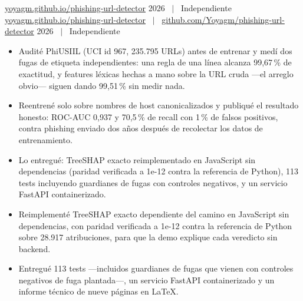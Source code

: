 \ifonepage
{}%
  {\href{https://yoyagm.github.io/phishing-url-detector/}{yoyagm.github.io/phishing-url-detector}}%
  {2026 \ $\vert$ \ Independiente}
\else
{}%
  {\href{https://yoyagm.github.io/phishing-url-detector/}{yoyagm.github.io/phishing-url-detector}
   \ $\vert$ \ \href{https://github.com/Yoyagm/phishing-url-detector}{github.com/Yoyagm/phishing-url-detector}}%
  {2026 \ $\vert$ \ Independiente}
\fi
\begin{itemize}
  \item Audité PhiUSIIL (UCI id 967, 235.795 URLs) antes de entrenar y medí dos fugas de etiqueta
        independientes: una regla de una línea alcanza 99,67\,\% de exactitud, y features léxicas
        hechas a mano sobre la URL cruda ---el arreglo obvio--- siguen dando 99,51\,\% sin medir nada.
  \item Reentrené solo sobre nombres de host canonicalizados y publiqué el resultado honesto:
        ROC-AUC 0,937 y 70,5\,\% de recall con 1\,\% de falsos positivos, contra phishing enviado
        dos años después de recolectar los datos de entrenamiento.
  \ifonepage
  \item Lo entregué: TreeSHAP exacto reimplementado en JavaScript sin dependencias (paridad
        verificada a 1e-12 contra la referencia de Python), 113 tests incluyendo guardianes de
        fugas con controles negativos, y un servicio FastAPI containerizado.
  \else
  \item Reimplementé TreeSHAP exacto dependiente del camino en JavaScript sin dependencias, con
        paridad verificada a 1e-12 contra la referencia de Python sobre 28.917 atribuciones, para
        que la demo explique cada veredicto sin backend.
  \item Entregué 113 tests ---incluidos guardianes de fugas que vienen con controles negativos de
        fuga plantada---, un servicio FastAPI containerizado y un informe técnico de nueve páginas
        en LaTeX.
  \fi
\end{itemize}

